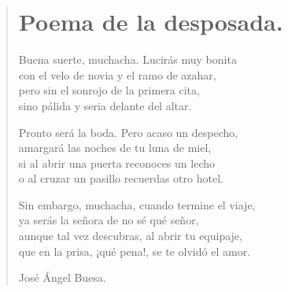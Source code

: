 \documentclass[11pt, portrait, twoside, notitlepage, openright]{book}
\begin{document}
\newpage
\begin{verse}
\begin{center}
\section{Poema de la desposada.}
\end{center}
Buena suerte, muchacha. Lucirás muy bonita\\
con el velo de novia y el ramo de azahar,\\
pero sin el sonrojo de la primera cita,\\
sino pálida y seria delante del altar.
\newline

Pronto será la boda. Pero acaso un despecho,\\
amargará las noches de tu luna de miel,\\
si al abrir una puerta reconoces un lecho\\
o al cruzar un pasillo recuerdas otro hotel.
\newline

Sin embargo, muchacha, cuando termine el viaje,\\
ya serás la señora de no sé qué señor,\\
aunque tal vez descubras, al abrir tu equipaje,\\
que en la prisa, ¡qué pena!, se te olvidó el amor.
\newline

José Ángel Buesa.
\end{verse}
\end{document}
